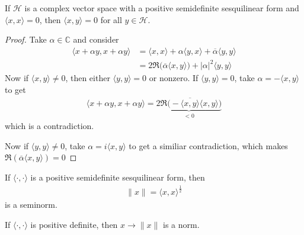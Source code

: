 \begin{proposition}
  If $\mathcal{H}$ is a complex vector space with a positive
  semidefinite sesquilinear form and $\langle  x , x \rangle = 0$,
  then $\langle  x , y \rangle  = 0$ for all $y \in \mathcal{H}$.
\end{proposition}
\begin{proof}
  Take $\alpha \in \mathbb{C}$ and consider
  \begin{align*}
    \langle x + \alpha y , x  +\alpha y \rangle  & = \langle x , x
    \rangle  + \alpha \langle y , x \rangle  + \overline{\alpha}
    \langle y , y \rangle  \\
    &= 2 \Re \big(  \overline{\alpha} \langle x , y \rangle  \big) +
    |\alpha|^2 \langle y , y \rangle
  \end{align*}
  Now if $\langle  x , y \rangle \neq 0$, then either $\langle  y , y
  \rangle  = 0$ or nonzero. If $\langle  y , y \rangle = 0$, take
  $\alpha = - \langle x , y \rangle $ to get
  \begin{align*}
    \langle x +\alpha y , x + \alpha y \rangle = \underbrace{2\Re \big( -
    \overline{\langle x , y \rangle }\langle x , y \rangle \big)}_{< 0}
  \end{align*}
  which is a contradiction.

  Now if $\langle  y , y \rangle  \neq 0$, take $\alpha = i \langle
  x , y \rangle $ to get a similiar contradiction, which makes $\Re(
  \overline{\alpha} \langle x , y \rangle) = 0$
\end{proof}

\begin{definition}
  If $\langle  \cdot , \cdot \rangle $ is a positive semidefinite
  sesquilinear form, then
  \begin{align*}
    \|x\| =  \langle x , x \rangle^{\frac{1}{2}}
  \end{align*}
  is a seminorm.

  If $\langle \cdot , \cdot \rangle $ is positive definite, then $x
  \to \|x\|$ is a norm.
\end{definition}

